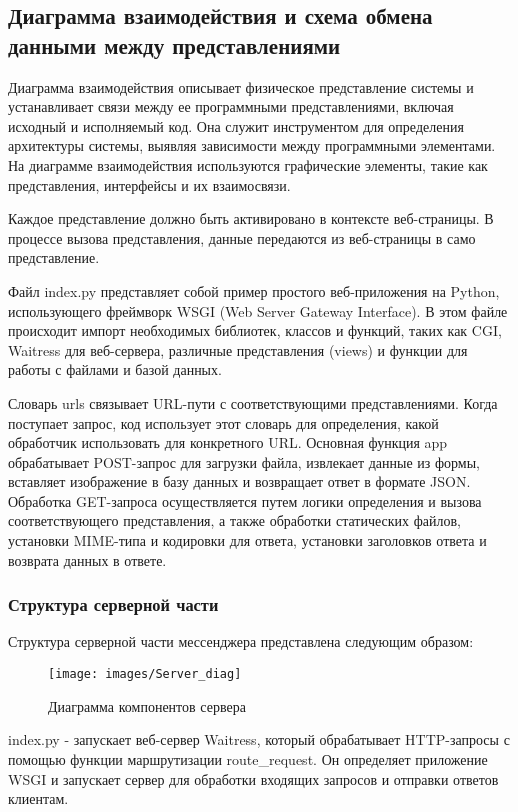 \subsection{Диаграмма взаимодействия и схема обмена данными между представлениями}

Диаграмма взаимодействия описывает физическое представление системы и устанавливает связи между ее программными представлениями, включая исходный и исполняемый код. Она служит инструментом для определения архитектуры системы, выявляя зависимости между программными элементами. На диаграмме взаимодействия используются графические элементы, такие как представления, интерфейсы и их взаимосвязи.

Каждое представление должно быть активировано в контексте веб-страницы. В процессе вызова представления, данные передаются из веб-страницы в само представление.

Файл index.py представляет собой пример простого веб-приложения на Python, использующего фреймворк WSGI (Web Server Gateway Interface). В этом файле происходит импорт необходимых библиотек, классов и функций, таких как CGI, Waitress для веб-сервера, различные представления (views) и функции для работы с файлами и базой данных.



Словарь urls связывает URL-пути с соответствующими представлениями. Когда поступает запрос, код использует этот словарь для определения, какой обработчик использовать для конкретного URL. Основная функция app обрабатывает POST-запрос для загрузки файла, извлекает данные из формы, вставляет изображение в базу данных и возвращает ответ в формате JSON. Обработка GET-запроса осуществляется путем логики определения и вызова соответствующего представления, а также обработки статических файлов, установки MIME-типа и кодировки для ответа, установки заголовков ответа и возврата данных в ответе.


\subsubsection{Структура серверной части}
Структура серверной части мессенджера представлена следующим образом:

\begin{figure}[H]
	\centering
	\texttt{[image: images/Server\_diag]}
	\caption{Диаграмма компонентов сервера}
	\label{fig:serverdiag}
\end{figure}

index.py - запускает веб-сервер Waitress, который обрабатывает HTTP-запросы с помощью функции маршрутизации route\_request. Он определяет приложение WSGI и запускает сервер для обработки входящих запросов и отправки ответов клиентам.

